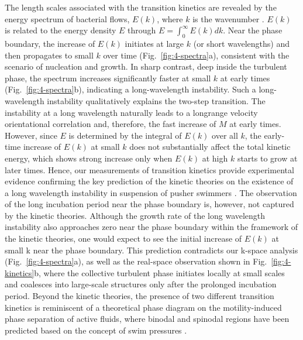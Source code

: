 The length scales associated with the transition kinetics are revealed by the energy spectrum of bacterial flows, $E(k)$, where $k$ is the wavenumber \cite{Wensink2012}. $E(k)$ is related to the energy density $E$ through $E=\int_0^\infty E(k)dk$. Near the phase boundary, the increase of $E(k)$ initiates at large $k$ (or short wavelengths) and then propagates to small $k$ over time (Fig.~\ref{fig:4-spectra}a), consistent with the scenario of nucleation and growth. In sharp contrast, deep inside the turbulent phase, the spectrum increases significantly faster at small $k$ at early times (Fig.~\ref{fig:4-spectra}b), indicating a long-wavelength instability. Such a long-wavelength instability qualitatively explains the two-step transition. The instability at a long wavelength naturally leads to a longrange velocity orientational correlation and, therefore, the fast increase of $M$ at early times.
However, since $E$ is determined by the integral of $E(k)$ over all $k$, the early-time increase of $E(k)$ at small $k$ does not substantially affect the total kinetic energy, which shows strong increase only when $E(k)$ at high $k$ starts to grow at later times.
Hence, our measurements of transition kinetics provide experimental evidence confirming the key prediction of the kinetic theories on the existence of a long wavelength instability in suspension of pusher swimmers \cite{Saintillan2008a, Saintillan2008b, Hohenegger2010, Saintillan2012}.
The observation of the long incubation period near the phase boundary is, however, not captured by the kinetic theories. Although the growth rate of the long wavelength instability also approaches zero near the phase boundary within the framework of the kinetic theories, one would expect to see the initial increase of $E(k)$ at small k near the phase boundary. This prediction contradicts our k-space analysis (Fig.~\ref{fig:4-spectra}a), as well as the real-space observation shown in Fig.~\ref{fig:4-kinetics}b, where the collective turbulent phase initiates locally at small scales and coalesces into large-scale structures only after the prolonged incubation period. Beyond the kinetic theories, the presence of two different transition kinetics is reminiscent of a theoretical phase diagram on the motility-induced phase separation of active fluids, where binodal and spinodal regions have been predicted based on the concept of swim pressures \cite{Takatori2015}.


